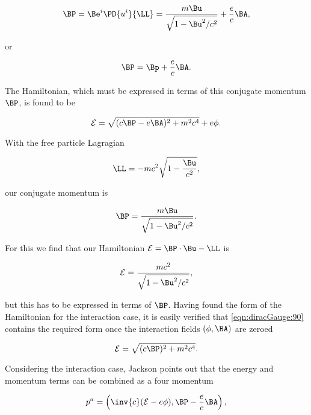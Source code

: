 \begin{equation}\label{eqn:diracGauge:50}
\BP = \Be^i \PD{u^i}{\LL} = \frac{m \Bu}{\sqrt{1 - \Bu^2/c^2}} + \frac{e}{c} \BA,
\end{equation}

or

\begin{equation}\label{eqn:diracGauge:70}
\BP = \Bp + \frac{e}{c} \BA.
\end{equation}

The Hamiltonian, which must be expressed in terms of this conjugate momentum $\BP$, is found to be

\begin{equation}\label{eqn:diracGauge:90}
\mathcal{E} = \sqrt{ (c \BP - e \BA)^2 + m^2 c^4 } + e \phi.
\end{equation}

With the free particle Lagragian 

\begin{equation}\label{eqn:diracGauge:110}
\LL = -m c^2 \sqrt{ 1 - \frac{\Bu}{c^2}} ,
\end{equation}

our conjugate momentum is

\begin{equation}\label{eqn:diracGauge:130}
\BP = \frac{m \Bu}{\sqrt{ 1 - \Bu^2/c^2} }.
\end{equation}

For this we find that our Hamiltonian $\mathcal{E} = \BP \cdot \Bu - \LL$ is

\begin{equation}\label{eqn:diracGauge:150}
\mathcal{E} = \frac{m c^2}{\sqrt{1 - \Bu^2/c^2}},
\end{equation}

but this has to be expressed in terms of $\BP$.  Having found the form of the Hamiltonian for the interaction case, it is easily verified that \ref{eqn:diracGauge:90} contains the required form once the interaction fields $(\phi, \BA)$ are zeroed

\begin{equation}\label{eqn:diracGauge:90b}
\mathcal{E} = \sqrt{ (c \BP)^2 + m^2 c^4 }.
\end{equation}

Considering the interaction case, Jackson points out that the energy and momentum terms can be combined as a four momentum

\begin{equation}\label{eqn:diracGauge:170}
p^a = \left( \inv{c}(\mathcal{E} - e \phi), \BP - \frac{e}{c}\BA \right),
\end{equation}

